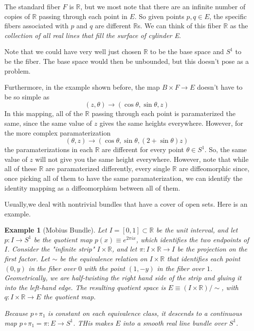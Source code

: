 \documentclass{article}
\newtheorem{example}{Example}[section]
\theoremstyle{remark}
\theoremstyle{definition}
\begin{document}
The standard fiber $F$ is $\mathbb{R}$, but we most note that there are an infinite number of copies of $\mathbb{R}$ passing through each point in $E$. So given points $p, q \in E$, the specific fibers associated with $p$ and $q$ are different $\mathbb{R}$s. We can think of this fiber $\mathbb{R}$ as the \textit{collection of all real lines that fill the surface of cylinder E}. 

Note that we could have very well just chosen $\mathbb{R}$ to be the base space and $S^1$ to be the fiber. The base space would then be unbounded, but this doesn't pose as a problem. 

Furthermore, in the example shown before, the map $B \times F \longrightarrow E$ doesn't have to be so simple as 
\[ (z, \theta) \longrightarrow (\cos{\theta}, \sin{\theta}, z) \]
In this mapping, all of the $\mathbb{R}$ passing through each point is paramaterized the same, since the same value of $z$ gives the same heights everywhere. However, for the more complex paramaterization
\[ (\theta, z) \longrightarrow (\cos{\theta}, \sin{\theta}, (2 + \sin{\theta}) z) \]
the paramaterizations in each $\mathbb{R}$ are different for every point $\theta \in S^1$. So, the same value of $z$ will not give you the same height everywhere. However, note that while all of these $\mathbb{R}$ are paramaterized differently, every single $\mathbb{R}$ are diffeomorphic since, once picking all of them to have the same paramaterization, we can identify the identity mapping as a diffeomorphism between all of them. 

Usually,we deal with nontrivial bundles that have a cover of open sets. Here is an example. 

\begin{example}[Mobius Bundle]
Let $I = [0,1] \subset \mathbb{R}$ be the unit interval, and let $p: I \longrightarrow S^1$ be the quotient map $p(x) \equiv e^{2 \pi i x}$, which identifies the two endpoints of $I$. Consider the "infinite strip" $I \times \mathbb{R}$, and let $\pi: I \times \mathbb{R} \longrightarrow I$ be the projection on the first factor. Let $\sim$ be the equivalence relation on $I \times \mathbb{R}$ that identifies each point $(0,y)$ in the fiber over $0$ with the point $(1, -y)$ in the fiber over $1$. Geometrically, we are half-twisting the right hand side of the strip and gluing it into the left-hand edge. The resulting quotient space is $E \equiv (I \times \mathbb{R})/ \sim$, with $q: I \times \mathbb{R} \longrightarrow E$ the quotient map. 

Because $p \circ \pi_1$ is constant on each equivalence class, it descends to a continuous map $p \circ \pi_1 = \pi: E \longrightarrow S^1$. THis makes $E$ into a smooth real line bundle over $S^1$. 
\end{example}
\end{document}
